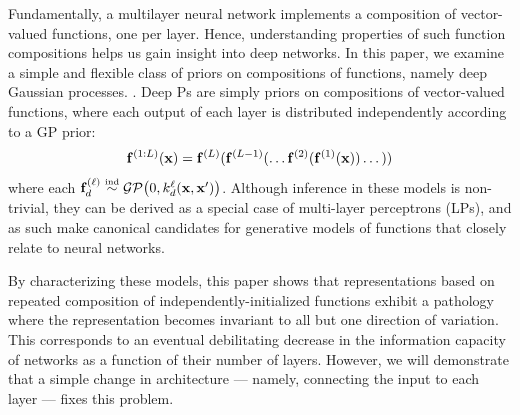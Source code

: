 \documentclass[twoside]{article}
\makeatletter
\newlength{\nonHumbleHeight}
\def\@humbleformat#1{{\settoheight{\nonHumbleHeight}{#1}\resizebox{!}{0.94\nonHumbleHeight}{#1}}}%
\def\humble#1{\@humbleformat{#1}}%
\newcommand{\gp}{{\humble GP}}
\newcommand{\MLP}{{\humble MLP}}
\makeatother
\begin{document}
Fundamentally, a multilayer neural network implements a composition of vector-valued functions, one per layer. Hence, understanding properties of such function compositions helps us gain insight into deep networks. In this paper, we examine a simple and flexible class of priors on compositions of functions, namely deep Gaussian processes. \citep{damianou2012deep}.  Deep \gp{}s are simply priors on compositions of vector-valued functions, where each output of each layer is distributed independently according to a GP prior:
%
\begin{align}
{\bf{f}}^{(1:L)}({\bf{x}}) = {\bf{f}}^{(L)}({\bf{f}}^{(L-1)}(\dots {\bf{f}}^{(2)}({\bf{f}}^{(1)}({\bf{x}})) \dots))
\end{align}
%
where each $\vf_d^{(\ell)} \simind \GPt{0}{k^\ell_d(\vx, \vx')}$. 
Although inference in these models is non-trivial, they can be derived as a special case of multi-layer perceptrons (\MLP{}s), and as such make canonical candidates for generative models of functions that closely relate to neural networks.

By characterizing these models, this paper shows that representations based on repeated composition of independently-initialized functions exhibit a pathology where the representation becomes invariant to all but one direction of variation. This corresponds to an eventual debilitating decrease in the information capacity of networks as a function of their number of layers. However, we will demonstrate that a simple change in architecture --- namely, connecting the input to each layer --- fixes this problem. 


\end{document}
